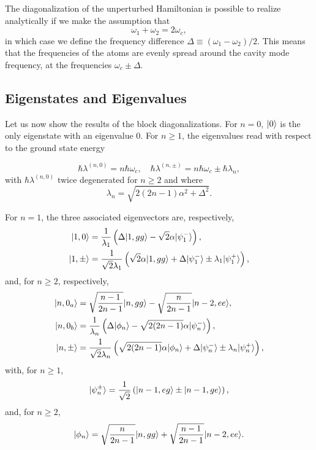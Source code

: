 The diagonalization of the unperturbed Hamiltonian is possible to realize analytically if we make the assumption that
\[ \omega_1 + \omega_2 = 2 \omega_c, \]
in which case we define the frequency difference $\Delta \equiv (\omega_1-\omega_2)/2$. This means that the frequencies of the atoms are evenly spread around the cavity mode frequency, at the frequencies $\omega_c \pm \Delta$.

\subsection{Eigenstates and Eigenvalues}

Let us now show the results of the block diagonalizations. For $n=0$, $| 0 \rangle$ is the only eigenstate with an eigenvalue 0. For $n \geq 1$, the eigenvalues read with respect to the ground state energy

\begin{equation}
    \hbar \lambda^{(n,0)} = n \hbar \omega_c, \quad \hbar \lambda^{(n,\pm)} = n \hbar \omega_c \pm \hbar \lambda_n,
\end{equation}
with $\hbar \lambda^{(n,0)}$ twice degenerated for $n \geq 2$ and where
\begin{equation}
    \lambda_n = \sqrt{ 2(2n-1) \alpha^2 + \Delta^2}.
\end{equation}

For $n=1$, the three associated eigenvectors are, respectively,
\begin{align}
    | 1,0 \rangle   & = \frac{1}{\lambda_1} \left( \Delta | 1,gg \rangle  - \sqrt{2} \alpha | \psi^-_1 \rangle \right),                                     \\
    | 1,\pm \rangle & = \frac{1}{\sqrt{2} \lambda_1} \left(\sqrt 2 \alpha | 1,gg \rangle + \Delta | \psi^-_1 \rangle \pm \lambda_1 | \psi^+_1 \rangle \right) ,
\end{align}
and, for $n \geq 2$, respectively,
\begin{align}
    | n,0_a \rangle & = \sqrt{\frac{n-1}{2n-1}} | n,gg \rangle - \sqrt{\frac{n}{2n-1}} | n-2,ee \rangle,                                                              \\
    | n,0_b \rangle & = \frac{1}{\lambda_n} \left( \Delta | \phi_n \rangle  - \sqrt{2(2n-1)} \alpha | \psi^-_n \rangle \right),                                       \\
    | n,\pm \rangle & =  \frac{1}{\sqrt 2 \lambda_n} \left( \sqrt{2(2n-1)} \alpha | \phi_n \rangle +  \Delta | \psi^-_n \rangle \pm \lambda_n | \psi^+_n \rangle \right),
\end{align}
with, for $n \geq 1$,
\begin{equation}
    | \psi^{\pm}_n \rangle = \frac{1}{\sqrt{2}} \left( | n-1,eg \rangle \pm | n-1,ge \rangle \right),
\end{equation}
and, for $n \geq 2$,
\begin{equation}
    | \phi_n \rangle = \sqrt{\frac{n}{2n-1}} | n,gg \rangle +\sqrt{\frac{n-1}{2n-1}} | n-2,ee \rangle. \\
\end{equation}


